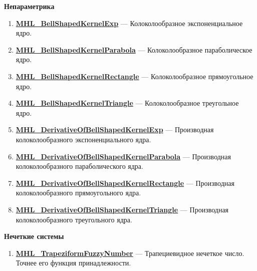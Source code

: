 \documentclass[a4paper,12pt]{article}
\begin{document}
\textbf{Непараметрика}
\begin{enumerate}

\item \textbf{\hyperref[MHL_BellShapedKernelExp]{MHL\_BellShapedKernelExp}} --- Колоколообразное экспоненциальное ядро.

\item \textbf{\hyperref[MHL_BellShapedKernelParabola]{MHL\_BellShapedKernelParabola}} --- Колоколообразное параболическое ядро.

\item \textbf{\hyperref[MHL_BellShapedKernelRectangle]{MHL\_BellShapedKernelRectangle}} --- Колоколообразное прямоугольное ядро.

\item \textbf{\hyperref[MHL_BellShapedKernelTriangle]{MHL\_BellShapedKernelTriangle}} --- Колоколообразное треугольное ядро.

\item \textbf{\hyperref[MHL_DerivativeOfBellShapedKernelExp]{MHL\_DerivativeOfBellShapedKernelExp}} --- Производная колоколообразного экспоненциального ядра.

\item \textbf{\hyperref[MHL_DerivativeOfBellShapedKernelParabola]{MHL\_DerivativeOfBellShapedKernelParabola}} --- Производная колоколообразного параболического ядра.

\item \textbf{\hyperref[MHL_DerivativeOfBellShapedKernelRectangle]{MHL\_DerivativeOfBellShapedKernelRectangle}} --- Производная колоколообразного прямоугольного ядра.

\item \textbf{\hyperref[MHL_DerivativeOfBellShapedKernelTriangle]{MHL\_DerivativeOfBellShapedKernelTriangle}} --- Производная колоколообразного треугольного ядра.

\end{enumerate}

\textbf{Нечеткие системы}
\begin{enumerate}

\item \textbf{\hyperref[MHL_TrapeziformFuzzyNumber]{MHL\_TrapeziformFuzzyNumber}} --- Трапециевидное нечеткое число. Точнее его функция принадлежности.

\end{enumerate}
\end{document}
